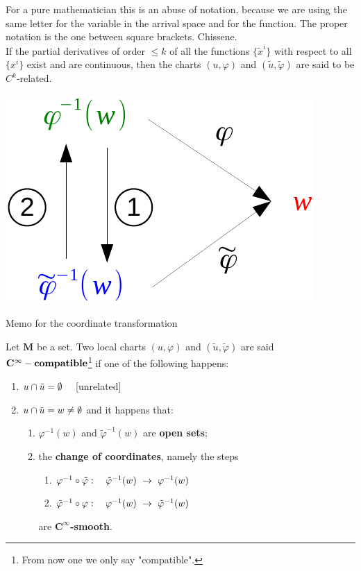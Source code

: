 \documentclass[../main.tex]{subfiles}
\begin{document}
For a pure mathematician this is an abuse of notation, because we are using the same letter for the variable in the arrival space and for the function. The proper notation is the one between square brackets. Chissene.\\
If the partial derivatives of order $\leq k$ of all the functions $\{\tilde{x}^i\}$ with respect to all $\{x^i\}$ exist and are continuous, then the charts $(u,\varphi)$ and $(\tilde{u},\tilde{\varphi})$ are said to be $C^k$-related.
\begin{marginfigure}
	\includegraphics{images/memo_trasf.pdf}
	\caption[Memo coordinate transformation]{Memo for the coordinate transformation}
\end{marginfigure} 
\begin{definition}
Let $\mathbf{M}$ be a set. Two local charts $(u,\varphi)$ and $(\tilde{u},\tilde\varphi)$ are said $\mathbf{C}^\infty-\textrm{\textbf{compatible}}$\footnote{From now one we only say "compatible".} if one of the following happens:
\begin{enumerate}
    \item $u\cap\Tilde{u}=\emptyset \quad$ [unrelated]
    \item \(u\cap\Tilde{u}=w\neq\emptyset\) and it happens that:
    \begin{enumerate}
        \item \(\varphi^{-1}(w)\) and $\tilde{\varphi}^{-1}(w)$ are \textbf{open sets};
        \item the \textbf{change of coordinates}, namely the steps
        \begin{enumerate}
            \item $\varphi^{-1}\circ\Tilde{\varphi}: \quad \Tilde{\varphi}^{-1}(w) \ \rightarrow \ \varphi^{-1}(w)$
            \item $\Tilde{\varphi}^{-1}\circ{\varphi}: \quad {\varphi}^{-1}(w) \ \rightarrow \ \Tilde{\varphi}^{-1}(w)$
        \end{enumerate}
        are $\mathbf{C}^\infty$\textbf{-smooth}.
    \end{enumerate}
\end{enumerate}
\end{definition}
\end{document}
